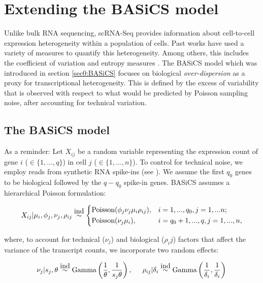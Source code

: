 
\section{Extending the  BASiCS model}

Unlike bulk RNA sequencing, scRNA-Seq provides information about cell-to-cell expression heterogeneity within a population of cells. Past works have used a variety of measures to quantify this heterogeneity. Among others, this includes the coefficient of variation \citep[CV,][]{Brennecke2013} and entropy measures \citep{Richard2016}. The BASiCS model \citep{Vallejos2015BASiCS, Vallejos2016} which was introduced in section \ref{sec0:BASiCS} focuses on biological \textit{over-dispersion} as a proxy for transcriptional heterogeneity. This is defined by the excess of variability that is observed with respect to what would be predicted by Poisson sampling noise, after accounting for technical variation. 

\subsection{The BASiCS model}

As a reminder: Let $X_{ij}$ be a random variable representing the expression count of gene $i$ ($ \in \{1, \ldots, q\}$) in cell $j$ ($\in \{ 1, \ldots ,n\}$).  To control for technical noise, we employ reads from synthetic RNA spike-ins (see \citep{Jiang2011}). We assume the first $q_0$ genes to be biological followed by the $q-q_0$ spike-in genes. BASiCS assumes a hierarchical Poisson formulation: 

\begin{equation} \label{eq::PoissonBASiCS}
 X_{ij}|\mu_i,\phi_j,\nu_j,\rho_{ij} \stackrel{\mbox{ind}}{\sim}
 \left\lbrace
  \begin{aligned}
    &\textnormal{Poisson}(\phi_j\nu_j\mu_i\rho_{ij}), && i=1,...,q_0,j=1,...n;  \\ 
    &\textnormal{Poisson}(\nu_j\mu_i), && i=q_0+1,...,q,j=1,...,n,    	    
  \end{aligned}
\right.
\end{equation} 

where, to account for technical ($\nu_j$) and biological ($\rho_ij$) factors that affect the variance of the transcript counts, we incorporate two random effects: 

\begin{equation} \label{eq::RandomEffectsBASiCS}
\nu_j|s_j,\theta \stackrel{\mbox{ind}}{\sim} \textnormal{Gamma}\left(\frac{1}{\theta},\frac{1}{s_j\theta}\right), \hspace{0.5cm} \rho_{ij}|\delta_i  \stackrel{\mbox{ind}}{\sim} \textnormal{Gamma}\left(\frac{1}{\delta_i},\frac{1}{\delta_i}\right)\\
\end{equation} 


